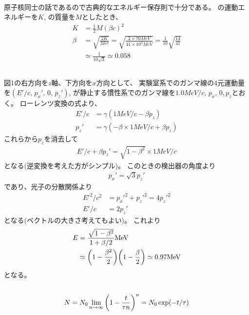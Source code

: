 \documentclass[../../master.tex]{subfiles}
\begin{document}
\subsection{}
原子核同士の話であるので古典的なエネルギー保存則で十分である。
の運動エネルギーを\(K\), の質量を\(M\)としたとき、
\begin{align}
    K &= \frac{1}{2}M(\beta c)^2\\
    \beta &= \sqrt{\frac{2K}{Mc^2}} = \sqrt{\frac{2\times 70 \si{MeV}}{41\times 10^3 \si{MeV}}}
        = \frac{1}{10}\sqrt{\frac{14}{41}}\\
    &\simeq \frac{1}{10\sqrt3} \simeq 0.058
\end{align}

\subsection{}
図1の右方向を\(z\)軸、下方向を\(x\)方向として、
実験室系でのガンマ線の4元運動量を\((E'/c,\,p_x',\,0,\,p_z')\),
が静止する慣性系でのガンマ線を\(1.0\si{MeV/c},\,p_x,\,0,p_z\)とおく。
ローレンツ変換の式より、
\begin{align}
    E'/c &= \gamma(1\si{MeV/c}-\beta p_z)\\
    p_z' &= \gamma(-\beta\times 1\si{MeV/c} +\beta p_z)
\end{align}
これらから\(p_z\)を消去して
\begin{align}
    E'/c + \beta p_z' = \sqrt{1-\beta^2} \times 1\si{MeV/c}
\end{align}
となる(逆変換を考えた方がシンプル)。
このときの検出器の角度より
\begin{align}
    p_x' = \sqrt{3} p_z'
\end{align}
であり、光子の分散関係より
\begin{align}
    E'^2/c^2 &= p_x'^2 + p_z'^2 = 4p_z'^2\\
    E'/c &= 2p_z'
\end{align}
となる(ベクトルの大きさ考えてもよい)。
これより
\begin{align}
    E &= \frac{\sqrt{1-\beta^2}}{1+\beta/2} \si{MeV}\\
    &\simeq \qty(1-\frac{\beta^2}{2})\qty(1-\frac{\beta}{2}) \simeq 0.97 \si{MeV}
\end{align}
となる。
\subsection{}
\begin{align}
    N = N_0\lim_{n\to\infty}\qty(1-\frac{t}{\tau n})^n = N_0 \exp(-t/\tau)
\end{align}
\end{document}
